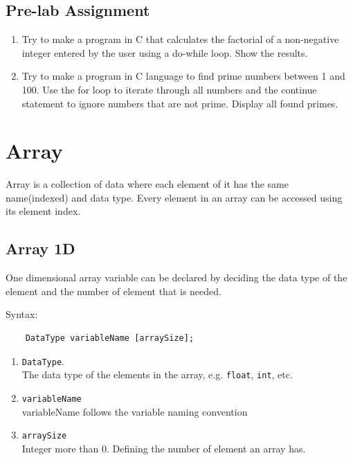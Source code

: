 \subsection{Pre-lab Assignment}
\begin{enumerate}
	\item Try to make a program in C that calculates the factorial of a non-negative integer entered by the user using a do-while loop. Show the results.
	\item Try to make a program in C language to find prime numbers between 1 and 100. Use the for loop to iterate through all numbers and the continue statement to ignore numbers that are not prime. Display all found primes.
\end{enumerate}

\section{Array}
Array is a collection of data where each element of it has the same name(indexed) and data type. Every element in an array can be accessed using its element index.
\subsection{Array 1D}
One dimensional array variable can be declared by deciding the data type of the element and the number of element that is needed.

Syntax:
\begin{verbatim}
    DataType variableName [arraySize];
\end{verbatim}
\begin{enumerate}
	\item \verb*|DataType|.\\
	      The data type of the elements in the array, e.g. \verb|float|, \verb|int|, etc.
	\item \verb*|variableName|\\
	      variableName follows the variable naming convention

	\item \verb*|arraySize| \\
	      Integer more than 0. Defining the number of element an array has.
\end{enumerate}

